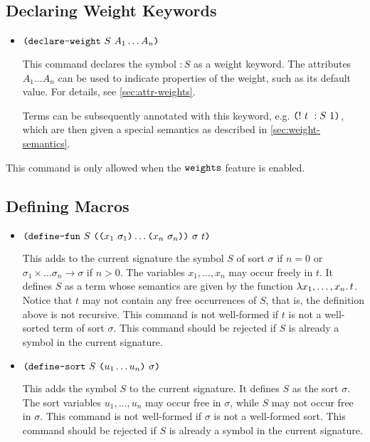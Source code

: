 \documentclass[english,a4paper,10pt]{article}
\begin{document}
\subsection{Declaring Weight Keywords}
\label{ssec:declaring-weights}

\begin{itemize}
\item $\texttt{(}\texttt{declare-weight}\mbox{ }S\mbox{ }A_1 \ldots A_n\texttt{)}$

This command declares the symbol $:S$ as a weight keyword.
The attributes $A_1 \ldots A_n$ can be used to indicate properties of the weight,
such as its default value.
For details, see \cref{sec:attr-weights}.

Terms can be subsequently annotated
with this keyword, e.g. $\texttt{(}!\mbox{ }t\mbox{ }:S\mbox{ }1\texttt{)}$,
which are then given a special semantics as described in \cref{sec:weight-semantics}.

\end{itemize}
This command is only allowed when the $\texttt{weights}$ feature is enabled.

\subsection{Defining Macros}

\begin{itemize}
\item $\texttt{(}\texttt{define-fun}\mbox{ }S\mbox{ }\texttt{(}\texttt{(}x_1\mbox{ }\sigma_1\texttt{)} \ldots \texttt{(}x_n\mbox{ }\sigma_n\texttt{)}\texttt{)}\mbox{ }\sigma\mbox{ }t\texttt{)}$

This adds to the current signature
the symbol $S$ of sort $\sigma$
if $n=0$ or $\sigma_1 \times \ldots \sigma_n \rightarrow \sigma$ if $n>0$.
The variables $x_1, \ldots, x_n$ may occur freely in $t$.
It defines $S$ as a term whose semantics are given by the function
$\lambda x_1, \ldots, x_n \ldotp t$.
Notice that $t$ may not contain any free occurrences of $S$,
that is, the definition above is not recursive.
This command is not well-formed if $t$ is not a well-sorted
term of sort $\sigma$.
This command should be rejected if $S$ is already
a symbol in the current signature.

\item $\texttt{(}\texttt{define-sort}\mbox{ }S\mbox{ }\texttt{(}u_1 \ldots u_n\texttt{)}\mbox{ }\sigma\texttt{)}$

This adds the symbol $S$ to the current signature.
It defines $S$ as the sort $\sigma$.
The sort variables $u_1, \ldots, u_n$
may occur free in $\sigma$,
while $S$ may not occur free in $\sigma$.
This command is not well-formed if $\sigma$
is not a well-formed sort.
This command should be rejected if $S$ is already
a symbol in the current signature.

\end{itemize}
\end{document}
